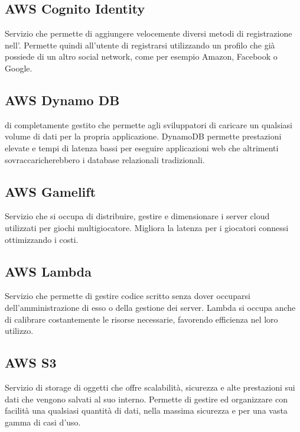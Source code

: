 \subsection*{AWS Cognito Identity}
Servizio  che permette di aggiungere velocemente diversi metodi di registrazione nell'. Permette quindi all'utente di registrarsi utilizzando un profilo che già possiede di un altro social network, come per esempio Amazon, Facebook o Google. 

\subsection*{AWS Dynamo DB}
  di  completamente gestito che permette agli sviluppatori di caricare un qualsiasi volume di dati per la propria applicazione. DynamoDB permette prestazioni elevate e tempi di latenza bassi per eseguire applicazioni web che altrimenti sovraccaricherebbero i database relazionali tradizionali.

\subsection*{AWS Gamelift}
Servizio  che si occupa di distribuire, gestire e dimensionare i server cloud utilizzati per giochi multigiocatore. Migliora la latenza per i giocatori connessi ottimizzando i costi.

\subsection*{AWS Lambda}
Servizio  che permette di gestire codice scritto senza dover occuparsi dell'amministrazione di esso o della gestione dei server. Lambda si occupa anche di calibrare costantemente le risorse necessarie, favorendo efficienza nel loro utilizzo. 

\subsection*{AWS S3}
Servizio  di storage di oggetti che offre scalabilità, sicurezza e alte prestazioni sui dati che vengono salvati al suo interno. Permette di gestire ed organizzare con facilità una qualsiasi quantità di dati, nella massima sicurezza e per una vasta gamma di casi d'uso.
